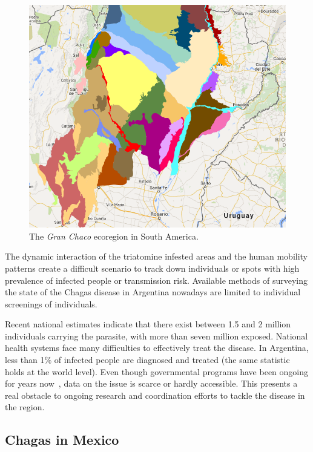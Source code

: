 \begin{figure}[h!]
\centering
\includegraphics[width=0.75\columnwidth]{figures/Ambientes_GranChaco_TNC-Argentina/Ambientes_GranChaco_TNC-Argentina.png}
\caption{The \textit{Gran Chaco} ecoregion in South America.%
}
\label{fig:granchaco}
\end{figure}


The dynamic interaction of the triatomine infested areas and the human mobility patterns create a difficult scenario to track down individuals or spots with high prevalence of infected people or transmission risk. Available methods of surveying the state of the Chagas disease in Argentina nowadays are limited to individual screenings of individuals. %

Recent national estimates indicate that there exist between 1.5 and 2 million individuals carrying the parasite, with more than seven million exposed. National health systems face many difficulties to effectively treat the disease.
In Argentina, less than 1\% of infected people are diagnosed and treated
(the same statistic holds at the world level).
Even though governmental programs have been ongoing for years now~\cite{plan_nacional_chagas}, data on the issue is scarce or hardly accessible. This presents a real obstacle to ongoing research and coordination efforts to tackle the disease in the region.


\subsection{Chagas in  Mexico}\label{endemic_zone_mexico}



